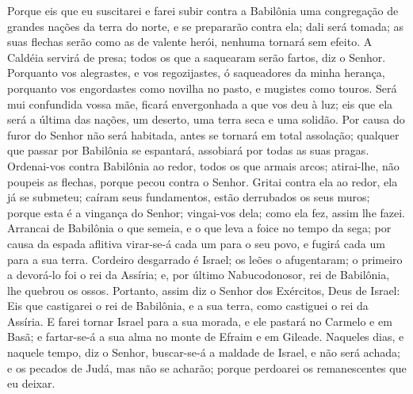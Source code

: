 Porque eis que eu suscitarei e farei subir contra a Babilônia uma
congregação de grandes nações da terra do norte, e se prepararão
contra ela; dali será tomada; as suas flechas serão como as de
valente herói, nenhuma tornará sem efeito. A Caldéia servirá
de presa; todos os que a saquearam serão fartos, diz o Senhor.
Porquanto vos alegrastes, e vos regozijastes, ó saqueadores
da minha herança, porquanto vos engordastes como novilha no pasto, e
mugistes como touros. Será mui confundida vossa mãe, ficará
envergonhada a que vos deu à luz; eis que ela será a última das
nações, um deserto, uma terra seca e uma solidão. Por causa
do furor do Senhor não será habitada, antes se tornará em total
assolação; qualquer que passar por Babilônia se espantará, assobiará
por todas as suas pragas. Ordenai-vos contra Babilônia ao
redor, todos os que armais arcos; atirai-lhe, não poupeis as
flechas, porque pecou contra o Senhor. Gritai contra ela ao
redor, ela já se submeteu; caíram seus fundamentos, estão derrubados
os seus muros; porque esta é a vingança do Senhor; vingai-vos dela;
como ela fez, assim lhe fazei. Arrancai de Babilônia o que
semeia, e o que leva a foice no tempo da sega; por causa da espada
aflitiva virar-se-á cada um para o seu povo, e fugirá cada um para a
sua terra. Cordeiro desgarrado é Israel; os leões o
afugentaram; o primeiro a devorá-lo foi o rei da Assíria; e, por
último Nabucodonosor, rei de Babilônia, lhe quebrou os ossos.
Portanto, assim diz o Senhor dos Exércitos, Deus de Israel:
Eis que castigarei o rei de Babilônia, e a sua terra, como castiguei
o rei da Assíria. E farei tornar Israel para a sua morada, e
ele pastará no Carmelo e em Basã; e fartar-se-á a sua alma no monte
de Efraim e em Gileade. Naqueles dias, e naquele tempo, diz o
Senhor, buscar-se-á a maldade de Israel, e não será achada; e os
pecados de Judá, mas não se acharão; porque perdoarei os
remanescentes que eu deixar.

